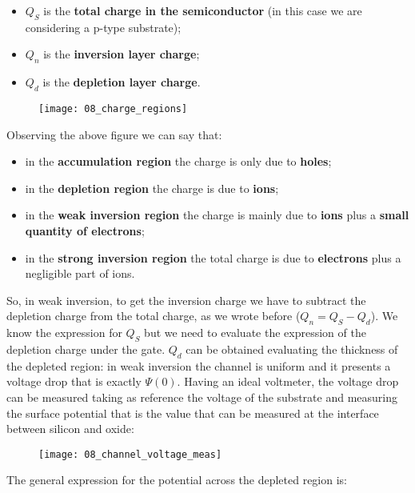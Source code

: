 \documentclass[a4paper, 12pt, twoside, openright]{report}
\begin{document}
\begin{itemize}
\item $Q_{S}$ is the \textbf{total charge in the semiconductor} (in this case we are considering a p-type substrate);
\item $Q_{n}$ is the \textbf{inversion layer charge};
\item $Q_{d}$ is the \textbf{depletion layer charge}.
\end{itemize}


	\begin{figure}[H]
	\centering
	\texttt{[image: 08\_charge\_regions]}
	\caption{}
	\label{}
	\end{figure}





Observing the above figure we can say that:

\begin{itemize}
\item in the \textbf{accumulation region} the charge is only due to \textbf{holes};
\item in the \textbf{depletion region} the charge is due to \textbf{ions};
\item in the \textbf{weak inversion region} the charge is mainly due to \textbf{ions} plus a \textbf{small quantity of electrons};
\item in the \textbf{strong inversion region} the total charge is due to \textbf{electrons} plus a negligible part of ions.
\end{itemize}

So, in weak inversion, to get the inversion charge we have to subtract the depletion charge from the total charge, as we wrote before ($Q_n = Q_S - Q_d$). We know the expression for $Q_{S}$ but we need to evaluate the expression of the  depletion charge under the gate. $Q_{d}$ can be obtained evaluating the thickness of the depleted region: in weak inversion the channel is uniform and it presents a voltage drop that is exactly $\Psi(0)$. Having an ideal voltmeter, the voltage drop can be measured taking as reference the voltage of the substrate and measuring the surface potential that is the value that can be measured at the interface between silicon and oxide:

	\begin{figure}[H]
	\centering
	\texttt{[image: 08\_channel\_voltage\_meas]}
	\caption{}
	\label{}
	\end{figure}

The general expression for the potential across the depleted region is:
\end{document}
